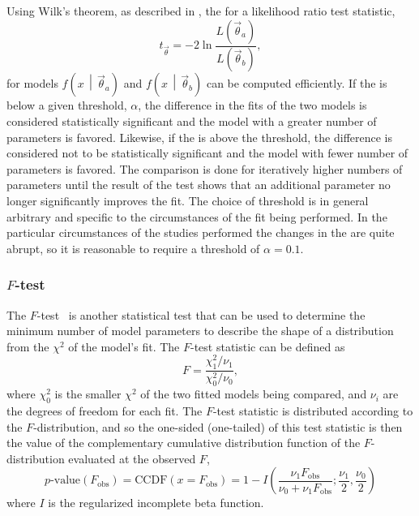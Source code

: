 Using Wilk's theorem, as described in , the \pvalue{} for a likelihood ratio test statistic,
\[
 t_{\vec{\theta}} = -2 \ln \frac{\displaystyle L\left(\vec{\theta}_{a}\right)}{\displaystyle L\left(\vec{\theta}_{b}\right)},
\]
for models $f\left(x\,\middle|\,\vec{\theta}_{a}\right)$ and $f\left(x\,\middle|\,\vec{\theta}_{b}\right)$ can be computed efficiently.
If the \pvalue{} is below a given threshold, $\alpha$, the difference in the fits of the two models is considered statistically significant and the model with a greater number of parameters is favored.
Likewise, if the \pvalue{} is above the threshold, the difference is considered not to be statistically significant and the model with fewer number of parameters is favored.
The comparison is done for iteratively higher numbers of parameters until the result of the test shows that an additional parameter no longer significantly improves the fit.
The choice of threshold is in general arbitrary and specific to the circumstances of the fit being performed.
In the particular circumstances of the studies performed the changes in the \pvalue{} are quite abrupt, so it is reasonable to require a \pvalue{} threshold of $\alpha=0.1$.

\subsubsection{$F$-test}

The $F$-test~\cite{snecdecor1991statistical} is another statistical test that can be used to determine the minimum number of model parameters to describe the shape of a distribution from the $\chi^2$ of the model's fit.
The $F$-test statistic can be defined as
\begin{equation}
 F = \frac{\chi^2_1/\nu_1}{\chi^2_0/\nu_0},
\end{equation}
where $\chi^2_0$ is the smaller $\chi^2$ of the two fitted models being compared, and $\nu_{i}$ are the degrees of freedom for each fit.
The $F$-test statistic is distributed according to the $F$-distribution, and so the one-sided (one-tailed) \pvalue{} of this test statistic is then the value of the complementary cumulative distribution function of the $F$-distribution evaluated at the observed $F$,
\begin{equation}
 p\text{-value}\left(F_{\text{obs}}\right) = \textrm{CCDF}\left(x=F_{\text{obs}}\right) = 1 - I\left(\frac{\nu_{1} F_{\text{obs}}}{\nu_{0} + \nu_{1} F_{\text{obs}}}; \frac{\nu_{1}}{2}, \frac{\nu_{0}}{2}\right)
\end{equation}
where $I$ is the regularized incomplete beta function.

